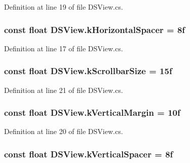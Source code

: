 Definition at line 19 of file D\+S\+View.\+cs.

\hypertarget{class_d_s_view_a54308b2e24c6fd769eb1045a72209189}{
\subsubsection[{k\+Horizontal\+Spacer}]{\setlength{\rightskip}{0pt plus 5cm}const float D\+S\+View.\+k\+Horizontal\+Spacer = 8f}}\label{class_d_s_view_a54308b2e24c6fd769eb1045a72209189}


Definition at line 17 of file D\+S\+View.\+cs.

\hypertarget{class_d_s_view_a79cbc537a62e1307c27305bfebf5547c}{
\subsubsection[{k\+Scrollbar\+Size}]{\setlength{\rightskip}{0pt plus 5cm}const float D\+S\+View.\+k\+Scrollbar\+Size = 15f}}\label{class_d_s_view_a79cbc537a62e1307c27305bfebf5547c}


Definition at line 21 of file D\+S\+View.\+cs.

\hypertarget{class_d_s_view_a0a48eeb269e3eececb312fe0d8bd0ab9}{
\subsubsection[{k\+Vertical\+Margin}]{\setlength{\rightskip}{0pt plus 5cm}const float D\+S\+View.\+k\+Vertical\+Margin = 10f}}\label{class_d_s_view_a0a48eeb269e3eececb312fe0d8bd0ab9}


Definition at line 20 of file D\+S\+View.\+cs.

\hypertarget{class_d_s_view_a74b4b6fe47ce6aa38b5992a8273b90b0}{
\subsubsection[{k\+Vertical\+Spacer}]{\setlength{\rightskip}{0pt plus 5cm}const float D\+S\+View.\+k\+Vertical\+Spacer = 8f}}\label{class_d_s_view_a74b4b6fe47ce6aa38b5992a8273b90b0}


